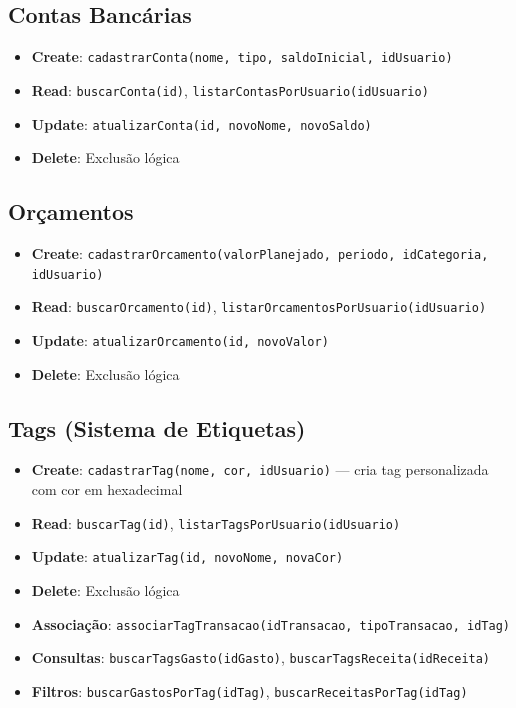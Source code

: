 \documentclass[12pt,a4paper]{article}
\begin{document}
\subsection{Contas Bancárias}
\begin{itemize}
  \item \textbf{Create}: \texttt{cadastrarConta(nome, tipo, saldoInicial, idUsuario)}
  \item \textbf{Read}: \texttt{buscarConta(id)}, \texttt{listarContasPorUsuario(idUsuario)}
  \item \textbf{Update}: \texttt{atualizarConta(id, novoNome, novoSaldo)}
  \item \textbf{Delete}: Exclusão lógica
\end{itemize}

\subsection{Orçamentos}
\begin{itemize}
  \item \textbf{Create}: \texttt{cadastrarOrcamento(valorPlanejado, periodo, idCategoria, idUsuario)}
  \item \textbf{Read}: \texttt{buscarOrcamento(id)}, \texttt{listarOrcamentosPorUsuario(idUsuario)}
  \item \textbf{Update}: \texttt{atualizarOrcamento(id, novoValor)}
  \item \textbf{Delete}: Exclusão lógica
\end{itemize}

\subsection{Tags (Sistema de Etiquetas)}
\begin{itemize}
  \item \textbf{Create}: \texttt{cadastrarTag(nome, cor, idUsuario)} — cria tag personalizada com cor em hexadecimal
  \item \textbf{Read}: \texttt{buscarTag(id)}, \texttt{listarTagsPorUsuario(idUsuario)}
  \item \textbf{Update}: \texttt{atualizarTag(id, novoNome, novaCor)}
  \item \textbf{Delete}: Exclusão lógica
  \item \textbf{Associação}: \texttt{associarTagTransacao(idTransacao, tipoTransacao, idTag)}
  \item \textbf{Consultas}: \texttt{buscarTagsGasto(idGasto)}, \texttt{buscarTagsReceita(idReceita)}
  \item \textbf{Filtros}: \texttt{buscarGastosPorTag(idTag)}, \texttt{buscarReceitasPorTag(idTag)}
\end{itemize}
\end{document}
